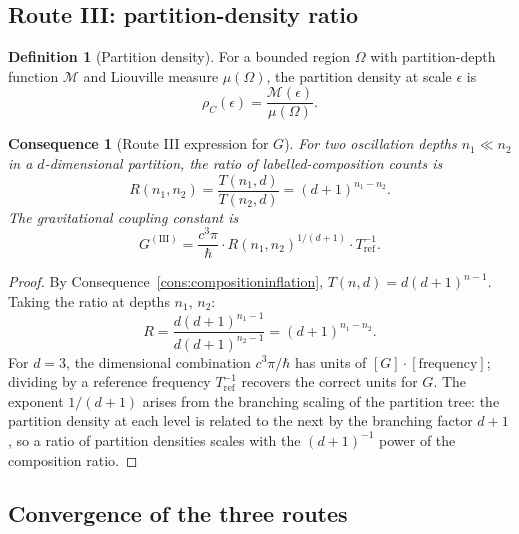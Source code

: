 \documentclass[11pt,twocolumn,a4paper]{article}
\theoremstyle{axiomstyle}
\theoremstyle{conseqstyle}
\newtheorem{consequence}{Consequence}
\theoremstyle{definition}
\newtheorem{definition}{Definition}
\theoremstyle{remark}
\newcommand{\Depth}{\mathcal{M}}
\begin{document}
\subsection{Route III: partition-density ratio}

\begin{definition}[Partition density]\label{def:partitiondensity}
For a bounded region $\Omega$ with partition-depth function $\Depth$ and Liouville measure $\mu(\Omega)$, the partition density at scale $\epsilon$ is
\begin{equation}
\rho_{C}(\epsilon)=\frac{\Depth(\epsilon)}{\mu(\Omega)}.
\end{equation}
\end{definition}

\begin{consequence}[Route III expression for $G$]\label{cons:routeIII}
For two oscillation depths $n_{1}\ll n_{2}$ in a $d$-dimensional partition, the ratio of labelled-composition counts is
\begin{equation}
R(n_{1},n_{2})=\frac{T(n_{1},d)}{T(n_{2},d)}=(d+1)^{n_{1}-n_{2}}.
\end{equation}
The gravitational coupling constant is
\begin{equation}
G^{(\mathrm{III})}=\frac{c^{3}\pi}{\hbar}\cdot R(n_{1},n_{2})^{1/(d+1)}\cdot T_{\mathrm{ref}}^{-1}.
\end{equation}
\end{consequence}

\begin{proof}
By Consequence~\ref{cons:compositioninflation}, $T(n,d)=d(d+1)^{n-1}$. Taking the ratio at depths $n_{1}$, $n_{2}$:
\begin{equation}
R=\frac{d(d+1)^{n_{1}-1}}{d(d+1)^{n_{2}-1}}=(d+1)^{n_{1}-n_{2}}.
\end{equation}
For $d=3$, the dimensional combination $c^{3}\pi/\hbar$ has units of $[G]\cdot[\text{frequency}]$; dividing by a reference frequency $T_{\mathrm{ref}}^{-1}$ recovers the correct units for $G$. The exponent $1/(d+1)$ arises from the branching scaling of the partition tree: the partition density at each level is related to the next by the branching factor $d+1$, so a ratio of partition densities scales with the $(d+1)^{-1}$ power of the composition ratio.
\end{proof}

\subsection{Convergence of the three routes}
\end{document}
